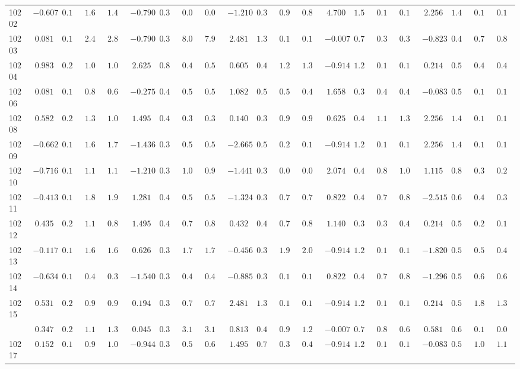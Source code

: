 \documentclass[6pt]{article}
\begin{document}
\begin{landscape}
{\begin{longtable}{lrrrrrrrrrrrrrrrrrrrr}
10202&$-0.607$&$0.166$&$1.613$&$1.457$&$-0.790$&$0.389$&$0.054$&$0.055$&$-1.210$&$0.340$&$0.914$&$0.856$&$ 4.700$&$1.542$&$0.119$&$0.147$&$ 2.256$&$1.456$&$0.164$&$0.191$\tabularnewline
10203&$ 0.081$&$0.188$&$2.427$&$2.880$&$-0.790$&$0.389$&$8.029$&$7.999$&$ 2.481$&$1.316$&$0.105$&$0.119$&$-0.007$&$0.714$&$0.316$&$0.348$&$-0.823$&$0.499$&$0.796$&$0.836$\tabularnewline
10204&$ 0.983$&$0.298$&$1.019$&$1.077$&$ 2.625$&$0.830$&$0.476$&$0.536$&$ 0.605$&$0.448$&$1.257$&$1.383$&$-0.914$&$1.254$&$0.135$&$0.149$&$ 0.214$&$0.594$&$0.498$&$0.462$\tabularnewline
10206&$ 0.081$&$0.188$&$0.802$&$0.674$&$-0.275$&$0.402$&$0.520$&$0.525$&$ 1.082$&$0.578$&$0.504$&$0.410$&$ 1.658$&$0.376$&$0.425$&$0.464$&$-0.083$&$0.547$&$0.104$&$0.101$\tabularnewline
10208&$ 0.582$&$0.233$&$1.369$&$1.071$&$ 1.495$&$0.495$&$0.379$&$0.346$&$ 0.140$&$0.376$&$0.917$&$0.940$&$ 0.625$&$0.488$&$1.162$&$1.350$&$ 2.256$&$1.456$&$0.164$&$0.191$\tabularnewline
10209&$-0.662$&$0.166$&$1.676$&$1.710$&$-1.436$&$0.337$&$0.586$&$0.597$&$-2.665$&$0.591$&$0.229$&$0.180$&$-0.914$&$1.254$&$0.135$&$0.149$&$ 2.256$&$1.456$&$0.164$&$0.191$\tabularnewline
10210&$-0.716$&$0.166$&$1.157$&$1.122$&$-1.210$&$0.352$&$1.032$&$0.992$&$-1.441$&$0.354$&$0.066$&$0.068$&$ 2.074$&$0.423$&$0.873$&$1.001$&$ 1.115$&$0.851$&$0.303$&$0.292$\tabularnewline
10211&$-0.413$&$0.169$&$1.845$&$1.928$&$ 1.281$&$0.457$&$0.565$&$0.578$&$-1.324$&$0.346$&$0.741$&$0.764$&$ 0.822$&$0.443$&$0.740$&$0.814$&$-2.515$&$0.681$&$0.463$&$0.364$\tabularnewline
10212&$ 0.435$&$0.216$&$1.137$&$0.867$&$ 1.495$&$0.495$&$0.770$&$0.812$&$ 0.432$&$0.415$&$0.713$&$0.827$&$ 1.140$&$0.395$&$0.373$&$0.451$&$ 0.214$&$0.594$&$0.216$&$0.194$\tabularnewline
10213&$-0.117$&$0.178$&$1.603$&$1.681$&$ 0.626$&$0.393$&$1.743$&$1.790$&$-0.456$&$0.337$&$1.967$&$2.002$&$-0.914$&$1.254$&$0.135$&$0.149$&$-1.820$&$0.555$&$0.539$&$0.451$\tabularnewline
10214&$-0.634$&$0.166$&$0.420$&$0.397$&$-1.540$&$0.332$&$0.482$&$0.499$&$-0.885$&$0.332$&$0.140$&$0.141$&$ 0.822$&$0.443$&$0.742$&$0.866$&$-1.296$&$0.509$&$0.617$&$0.639$\tabularnewline
10215&$ 0.531$&$0.227$&$0.983$&$0.952$&$ 0.194$&$0.389$&$0.780$&$0.781$&$ 2.481$&$1.316$&$0.105$&$0.119$&$-0.914$&$1.254$&$0.135$&$0.149$&$ 0.214$&$0.594$&$1.821$&$1.335$\tabularnewline
\newpage
10216&$ 0.347$&$0.208$&$1.114$&$1.342$&$ 0.045$&$0.393$&$3.186$&$3.120$&$ 0.813$&$0.497$&$0.948$&$1.241$&$-0.007$&$0.714$&$0.866$&$0.660$&$ 0.581$&$0.677$&$0.154$&$0.093$\tabularnewline
10217&$ 0.152$&$0.192$&$0.965$&$1.090$&$-0.944$&$0.376$&$0.591$&$0.609$&$ 1.495$&$0.741$&$0.385$&$0.451$&$-0.914$&$1.254$&$0.135$&$0.149$&$-0.083$&$0.547$&$1.077$&$1.102$\tabularnewline

\end{longtable}}
\end{landscape}
\end{document}
